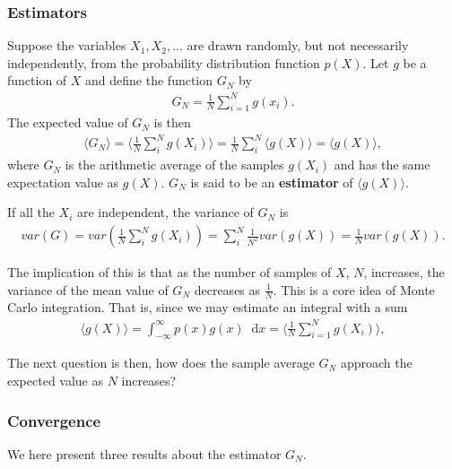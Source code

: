 \documentclass[twoside,english]{uiofysmaster}
\newcommand*\dif{\mathop{}\!\mathrm{d}}
\begin{document}
\subsubsection{Estimators}
Suppose the variables $X_1, X_2,...$ are drawn randomly, but not
necessarily independently, from the probability distribution function
$p(X)$. Let $g$ be a function of $X$ and define the function $G_N$ by
\begin{align}
	G_N = \frac{1}{N} \sum_{i=1}^N g(x_i).
\end{align}
The expected value of $G_N$ is then
\begin{align}
	\langle G_N \rangle = \langle \frac{1}{N} \sum_i^N g(X_i) \rangle = \frac{1}{N} \sum_i^N \langle g(X) \rangle = \langle g(X) \rangle,
\end{align} 
where $G_N$ is the arithmetic average of the samples $g(X_i)$ and has the same expectation value as $g(X)$. $G_N$ is said to be an \textbf{estimator} of $\langle g(X) \rangle$. 

If all the $X_i$ are independent, the variance of $G_N$ is
\begin{align}
	var(G) = var( \frac{1}{N} \sum_i^N g(X_i)  ) = \sum_i^N \frac{1}{N^2} var(g(X)) 
	= \frac{1}{N} var(g(X)).
\end{align}

The implication of this is that as the number of samples of $X$, $N$,
increases, the variance of the mean value of $G_N$ decreases as
$\frac{1}{N}$. This is a core idea of Monte Carlo integration. That
is, since we may estimate an integral with a sum
\begin{align}
	\langle g(X) \rangle = \int_{-\infty}^\infty p(x) g(x) \dif x = \langle \frac{1}{N} \sum_{i=1}^N g(X_i) \rangle,
\end{align}

The next question is then, how does the sample average $G_N$ approach the expected value as $N$ increases?


\subsubsection{Convergence}
We here present three results about the estimator $G_N$.
\end{document}
